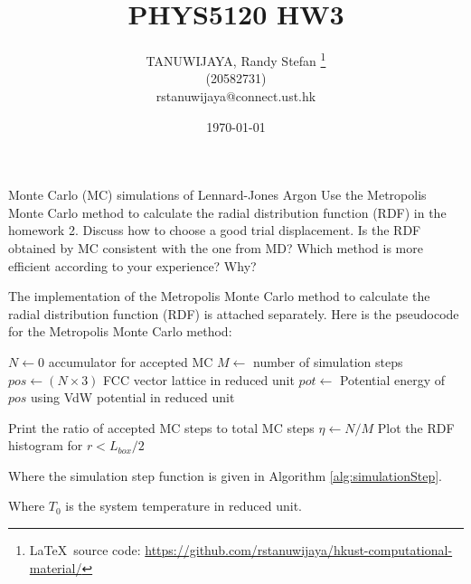 \documentclass{article}
\title{PHYS5120 HW3}
\author{TANUWIJAYA, Randy Stefan \footnote{\LaTeX\ source code: \url{https://github.com/rstanuwijaya/hkust-computational-material/}}\\ (20582731) \\ rstanuwijaya@connect.ust.hk}
\affil{Department of Physics - HKUST}
\date{\today}
\begin{document}
	\maketitle
	\begin{section}{Monte Carlo (MC) simulations of Lennard-Jones Argon}
		Use the Metropolis Monte Carlo method to calculate the radial distribution function (RDF) in the homework 2. Discuss how to choose a good trial displacement. Is the RDF obtained by MC consistent with the one from MD? Which method is more efficient according to your experience? Why?
		\begin{tcolorbox}[breakable]
			The implementation of the Metropolis Monte Carlo method to calculate the radial distribution function (RDF) is attached separately. Here is the pseudocode for the Metropolis Monte Carlo method:

			\begin{algorithm}[H]
				\caption{Calculating RDF with MC method}
				\label{alg:MCsimulation}
				$N \leftarrow 0$ accumulator for accepted MC\;
				$M \leftarrow $ number of simulation steps\;
				$pos \leftarrow (N \times 3)$ FCC vector lattice in reduced unit\;
				$pot \leftarrow$ Potential energy of $pos$ using VdW potential in reduced unit\; 
				

				Print the ratio of accepted MC steps to total MC steps $\eta \leftarrow N/M$\;
				Plot the RDF histogram for $r < L_{box}/2$\;
			\end{algorithm}

			Where the simulation step function is given in Algorithm \ref{alg:simulationStep}.

			\begin{algorithm}[H]
				\caption{Simulation Step Function for MC method}
				\label{alg:simulationStep}
			\end{algorithm}
			Where $T_0$ is the system temperature in reduced unit.


\end{tcolorbox}
\end{section}
\end{document}
